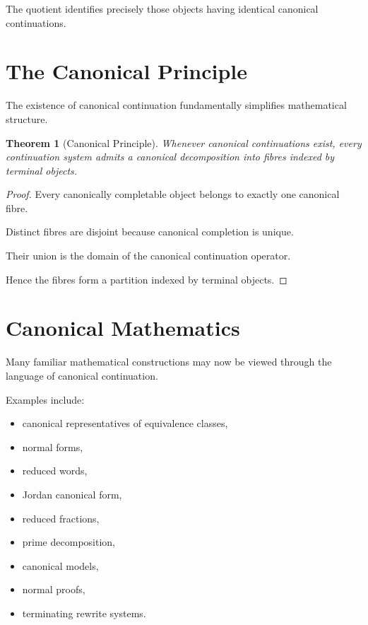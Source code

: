 \documentclass[13pt,openany]{book}
\theoremstyle{plain}
\newtheorem{theorem}{Theorem}[chapter]
\theoremstyle{definition}
\begin{document}
The quotient identifies precisely those objects having identical canonical
continuations.


\section{The Canonical Principle}

The existence of canonical continuation fundamentally simplifies mathematical
structure.

\begin{theorem}[Canonical Principle]
Whenever canonical continuations exist, every continuation system admits a
canonical decomposition into fibres indexed by terminal objects.
\end{theorem}

\begin{proof}
Every canonically completable object belongs to exactly one canonical fibre.

Distinct fibres are disjoint because canonical completion is unique.

Their union is the domain of the canonical continuation operator.

Hence the fibres form a partition indexed by terminal objects.
\end{proof}


\section{Canonical Mathematics}

Many familiar mathematical constructions may now be viewed through the language
of canonical continuation.

Examples include:

\begin{itemize}
\item canonical representatives of equivalence classes,

\item normal forms,

\item reduced words,

\item Jordan canonical form,

\item reduced fractions,

\item prime decomposition,

\item canonical models,

\item normal proofs,

\item terminating rewrite systems.
\end{itemize}
\end{document}
